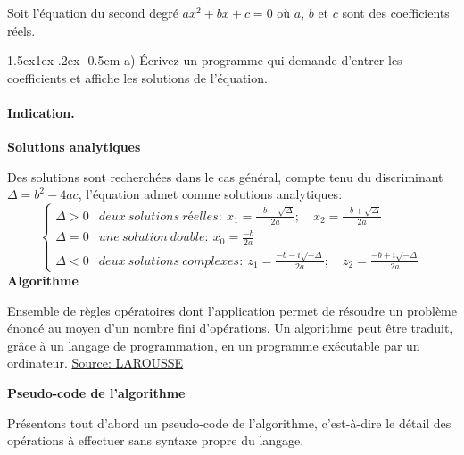 \documentclass[%
oneside,                 %
final,                   %
10pt,french]{article}
\makeatletter
\newenvironment{blockshaded}
{\def\FrameCommand{\fboxsep=3mm\colorbox{grayicon_block_background}}
 \MakeFramed {\advance\hsize-\width \FrameRestore}}{\endMakeFramed}
\newenvironment{block_grayiconadmon}[1][Block]{
\begin{blockshaded}
\noindent
 \textbf{#1}\par
\nobreak\noindent\ignorespaces
}
{
\end{blockshaded}
}
\newenvironment{doconceexercise}{}{}
\newcounter{doconceexercisecounter}
\newcommand\subex{\@startsection{paragraph}{4}{\z@}%
                  {1.5ex\@plus1ex \@minus.2ex}%
                  {-0.5em}%
                  {\normalfont\normalsize\bfseries}}
\makeatother
\begin{document}
\begin{doconceexercise}



Soit l’équation du second degré $a x^2 + bx + c = 0$ où $a$, $b$ et $c$ sont des coefficients réels.


\subex{a)}
Écrivez un programme qui demande d'entrer les coefficients et affiche les solutions de l'équation.


\paragraph{Indication.}
\textbf{Solutions analytiques}

Des solutions sont recherchées dans le cas général, compte tenu du discriminant $\Delta = b^2 - 4ac$, l'équation admet comme solutions analytiques:
\[  \left\{
\begin{array}{ll}
\Delta > 0 & deux \ solutions \ réelles : \ x_1 = \frac{-b - \sqrt{\Delta}}{2a}; \quad x_2 =  \frac{-b + \sqrt{\Delta}}{2a}\\
\Delta = 0 & une \ solution \ double : \ x_0 = \frac{-b}{2a} \\
\Delta < 0 & deux \ solutions \ complexes : \ z_1 = \frac{-b - i \sqrt{-\Delta}}{2a}; \quad z_2 = \frac{-b + i \sqrt{-\Delta}}{2a}
\end{array}
\right. \]
\textbf{Algorithme}


\begin{block_grayiconadmon}[Définition]
 Ensemble de règles opératoires dont l'application permet de résoudre un problème énoncé au moyen d'un nombre fini d'opérations. Un algorithme peut être traduit, grâce à un langage de programmation, en un programme exécutable par un ordinateur.
\href{{https://www.larousse.fr/dictionnaires/francais/algorithme/2238}}{Source: LAROUSSE}
\end{block_grayiconadmon} %



\textbf{Pseudo-code de l'algorithme}

 Présentons tout d'abord un pseudo-code de l'algorithme, c'est-à-dire le détail des opérations à effectuer sans syntaxe propre du langage.


\vspace{6mm}


\end{doconceexercise}
\end{document}
